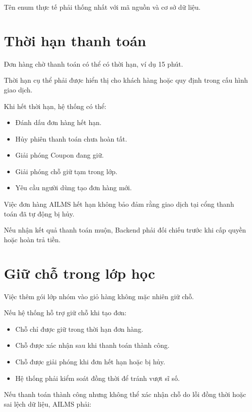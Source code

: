 \documentclass[12pt,a4paper]{article}
\begin{document}
Tên enum thực tế phải thống nhất với mã nguồn và cơ sở dữ liệu.

\section{Thời hạn thanh toán}

Đơn hàng chờ thanh toán có thể có thời hạn, ví dụ 15 phút.

Thời hạn cụ thể phải được hiển thị cho khách hàng
hoặc quy định trong cấu hình giao dịch.

Khi hết thời hạn, hệ thống có thể:

\begin{itemize}
    \item Đánh dấu đơn hàng hết hạn.
    \item Hủy phiên thanh toán chưa hoàn tất.
    \item Giải phóng Coupon đang giữ.
    \item Giải phóng chỗ giữ tạm trong lớp.
    \item Yêu cầu người dùng tạo đơn hàng mới.
\end{itemize}

Việc đơn hàng AILMS hết hạn không bảo đảm rằng giao dịch
tại cổng thanh toán đã tự động bị hủy.

Nếu nhận kết quả thanh toán muộn, Backend phải đối chiếu
trước khi cấp quyền hoặc hoàn trả tiền.

\section{Giữ chỗ trong lớp học}

Việc thêm gói lớp nhóm vào giỏ hàng không mặc nhiên giữ chỗ.

Nếu hệ thống hỗ trợ giữ chỗ khi tạo đơn:

\begin{itemize}
    \item Chỗ chỉ được giữ trong thời hạn đơn hàng.
    \item Chỗ được xác nhận sau khi thanh toán thành công.
    \item Chỗ được giải phóng khi đơn hết hạn hoặc bị hủy.
    \item Hệ thống phải kiểm soát đồng thời để tránh vượt sĩ số.
\end{itemize}

Nếu thanh toán thành công nhưng không thể xác nhận chỗ
do lỗi đồng thời hoặc sai lệch dữ liệu, AILMS phải:
\end{document}
